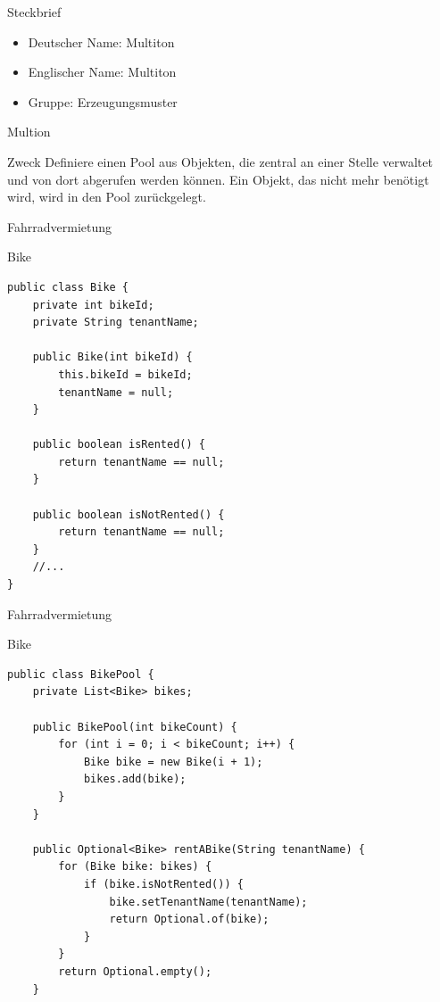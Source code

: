 \begin{frame}{Steckbrief}
	\begin{itemize}
 		\item Deutscher Name: Multiton
 		\item Englischer Name: Multiton
 		\item Gruppe: Erzeugungsmuster
 	\end{itemize}
\end{frame}

\begin{frame}{Multion}
	\begin{block}{Zweck}
 		Definiere einen Pool aus Objekten, die zentral an einer Stelle verwaltet und von dort abgerufen werden können. Ein Objekt, das nicht mehr benötigt wird, wird in den Pool zurückgelegt.
 	\end{block}
\end{frame}


\begin{frame}[fragile]{Fahrradvermietung}
	\begin{exampleblock}{Bike}
 		\begin{lstlisting}
public class Bike {
	private int bikeId;
	private String tenantName;
	
	public Bike(int bikeId) {
		this.bikeId = bikeId;
		tenantName = null;
	}
	
	public boolean isRented() {
		return tenantName == null;
	}
	
	public boolean isNotRented() {
		return tenantName == null;
	} 
    //...
}

        \end{lstlisting}
 	\end{exampleblock}
\end{frame}

\begin{frame}[fragile]{Fahrradvermietung}
	\begin{exampleblock}{Bike}
 		\begin{lstlisting}
public class BikePool {
	private List<Bike> bikes;
	
	public BikePool(int bikeCount) {
		for (int i = 0; i < bikeCount; i++) {
			Bike bike = new Bike(i + 1);
			bikes.add(bike);
		}
	}
	
	public Optional<Bike> rentABike(String tenantName) {
		for (Bike bike: bikes) {
			if (bike.isNotRented()) {
				bike.setTenantName(tenantName);
				return Optional.of(bike);
			}
		}
		return Optional.empty();
	}
        \end{lstlisting}
 	\end{exampleblock}
\end{frame}

